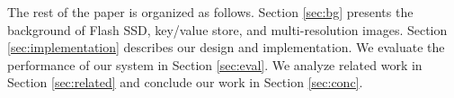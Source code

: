 

The rest of the paper is organized as follows. Section \ref{sec:bg}
presents the background of Flash SSD, key/value store, and
multi-resolution images. Section \ref{sec:implementation} describes
our design and implementation.
We evaluate the performance of our system in Section \ref{sec:eval}.
We analyze related work in Section \ref{sec:related} and conclude our
work in Section \ref{sec:conc}.

